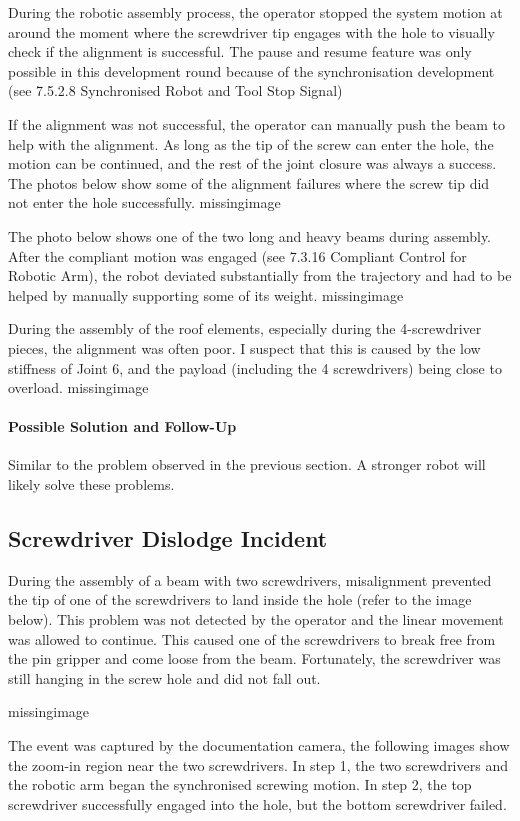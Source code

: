 During the robotic assembly process, the operator stopped the system motion at around the moment where the screwdriver tip engages with the hole to visually check if the alignment is successful. The pause and resume feature was only possible in this development round because of the synchronisation development (see 7.5.2.8 Synchronised Robot and Tool Stop Signal)

If the alignment was not successful, the operator can manually push the beam to help with the alignment. As long as the tip of the screw can enter the hole, the motion can be continued, and the rest of the joint closure was always a success. The photos below show some of the alignment failures where the screw tip did not enter the hole successfully. 
missingimage

The photo below shows one of the two long and heavy beams during assembly. After the compliant motion was engaged (see 7.3.16 Compliant Control for Robotic Arm), the robot deviated substantially from the trajectory and had to be helped by manually supporting some of its weight.
missingimage

During the assembly of the roof elements, especially during the 4-screwdriver pieces, the alignment was often poor. I suspect that this is caused by the low stiffness of Joint 6, and the payload (including the 4 screwdrivers) being close to overload. 
missingimage

\paragraph{Possible Solution and Follow-Up}
Similar to the problem observed in the previous section. A stronger robot will likely solve these problems.

\subsection{Screwdriver Dislodge Incident}
During the assembly of a beam with two screwdrivers, misalignment prevented the tip of one of the screwdrivers to land inside the hole (refer to the image below). This problem was not detected by the operator and the linear movement was allowed to continue. This caused one of the screwdrivers to break free from the pin gripper and come loose from the beam. Fortunately, the screwdriver was still hanging in the screw hole and did not fall out.

missingimage

The event was captured by the documentation camera, the following images show the zoom-in region near the two screwdrivers. In step 1, the two screwdrivers and the robotic arm began the synchronised screwing motion. In step 2, the top screwdriver successfully engaged into the hole, but the bottom screwdriver failed. 

